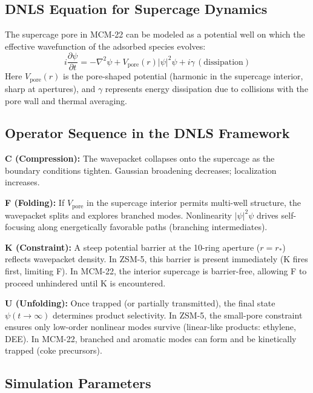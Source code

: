 \documentclass[11pt]{article}
\begin{document}
\subsection{DNLS Equation for Supercage Dynamics}

The supercage pore in MCM-22 can be modeled as a potential well on which the effective wavefunction of the adsorbed species evolves:
$$i\frac{\partial \psi}{\partial t} = -\nabla^2\psi + V_{\mathrm{pore}}(r)|\psi|^2\psi + i\gamma\,(\text{dissipation})$$
Here $V_{\mathrm{pore}}(r)$ is the pore-shaped potential (harmonic in the supercage interior, sharp at apertures), and $\gamma$ represents energy dissipation due to collisions with the pore wall and thermal averaging.

\subsection{Operator Sequence in the DNLS Framework}

\textbf{C (Compression):} The wavepacket collapses onto the supercage as the boundary conditions tighten. Gaussian broadening decreases; localization increases.

\textbf{F (Folding):} If $V_{\mathrm{pore}}$ in the supercage interior permits multi-well structure, the wavepacket splits and explores branched modes. Nonlinearity $|\psi|^2\psi$ drives self-focusing along energetically favorable paths (branching intermediates).

\textbf{K (Constraint):} A steep potential barrier at the 10-ring aperture ($r=r_*$) reflects wavepacket density. In ZSM-5, this barrier is present immediately (K fires first, limiting F). In MCM-22, the interior supercage is barrier-free, allowing F to proceed unhindered until K is encountered.

\textbf{U (Unfolding):} Once trapped (or partially transmitted), the final state $\psi(t\to\infty)$ determines product selectivity. In ZSM-5, the small-pore constraint ensures only low-order nonlinear modes survive (linear-like products: ethylene, DEE). In MCM-22, branched and aromatic modes can form and be kinetically trapped (coke precursors).

\subsection{Simulation Parameters}
\end{document}

